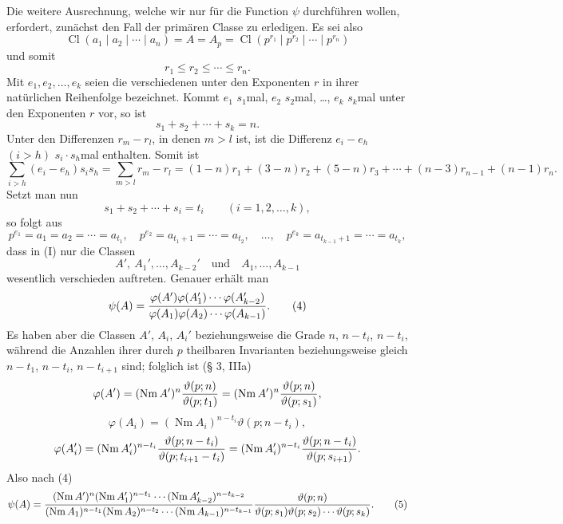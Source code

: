 \documentclass[11pt,a4paper]{article}
\newcommand{\Cl}{\operatorname{Cl}}
\newcommand{\Nm}{\operatorname{Nm}}
\newcommand{\tht}{\vartheta}
\begin{document}
Die weitere Ausrechnung, welche wir nur für die Function $\psi$ durchführen wollen, erfordert, zunächst den Fall der primären Classe zu erledigen. Es sei also
\[
 \Cl(a_1\mid a_2\mid\cdots\mid a_n)=A=A_p=
 \Cl(p^{r_1}\mid p^{r_2}\mid\cdots\mid p^{r_n})
\]
und somit
\[
 r_1\le r_2\le\cdots\le r_n.
\]
Mit $e_1,e_2,\ldots,e_k$ seien die verschiedenen unter den Exponenten $r$ in ihrer natürlichen Reihenfolge bezeichnet. Kommt $e_1$ $s_1$mal, $e_2$ $s_2$mal, \ldots, $e_k$ $s_k$mal unter den Exponenten $r$ vor, so ist
\begin{equation}
 s_1+s_2+\cdots+s_k=n.
\tag{1}
\end{equation}
Unter den Differenzen $r_m-r_l$, in denen $m>l$ ist, ist die Differenz $e_i-e_h$ $(i>h)$ $s_i\cdot s_h$mal enthalten. Somit ist
\begin{equation}
 \sum_{i>h}(e_i-e_h)s_i s_h=\sum_{m>l}r_m-r_l
 =(1-n)r_1+(3-n)r_2+(5-n)r_3+\cdots+(n-3)r_{n-1}+(n-1)r_n.
\tag{2}
\end{equation}
Setzt man nun
\[
 s_1+s_2+\cdots+s_i=t_i\qquad (i=1,2,\ldots,k),
\]
so folgt aus
\begin{equation}
 p^{e_1}=a_1=a_2=\cdots=a_{t_1},\quad
 p^{e_2}=a_{t_1+1}=\cdots=a_{t_2},\quad\ldots,\quad
 p^{e_k}=a_{t_{k-1}+1}=\cdots=a_{t_k},
\tag{3}
\end{equation}
dass in (I) nur die Classen
\[
 A',\ A_1',\ldots,A_{k-2}'
\quad\text{und}\quad
 A_1,\ldots,A_{k-1}
\]
wesentlich verschieden auftreten. Genauer erhält man
\begin{equation}
 \psi(A)=
 {\varphi(A')\varphi(A_1')\cdots\varphi(A_{k-2}')
 \over
 \varphi(A_1)\varphi(A_2)\cdots\varphi(A_{k-1})}.
\tag{4}
\end{equation}
Es haben aber die Classen $A'$, $A_i$, $A_i'$ beziehungsweise die Grade $n$, $n-t_i$, $n-t_i$, während die Anzahlen ihrer durch $p$ theilbaren Invarianten beziehungsweise gleich $n-t_1$, $n-t_i$, $n-t_{i+1}$ sind; folglich ist (§ 3, IIIa)
\[
 \varphi(A')=(\Nm A')^n {\tht(p;n)\over\tht(p;t_1)}=(\Nm A')^n {\tht(p;n)\over\tht(p;s_1)},
\]
\[
 \varphi(A_i)=(\Nm A_i)^{n-t_i}\tht(p;n-t_i),
\]
\[
 \varphi(A_i')=(\Nm A_i')^{n-t_i}
 {\tht(p;n-t_i)\over\tht(p;t_{i+1}-t_i)}
 = (\Nm A_i')^{n-t_i}{\tht(p;n-t_i)\over\tht(p;s_{i+1})}.
\]
Also nach (4)
\begin{equation}
 \psi(A)=
 { (\Nm A')^n(\Nm A_1')^{n-t_1}\cdots(\Nm A_{k-2}')^{n-t_{k-2}}
 \over
 (\Nm A_1)^{n-t_1}(\Nm A_2)^{n-t_2}\cdots(\Nm A_{k-1})^{n-t_{k-1}} }
 {\tht(p;n)\over\tht(p;s_1)\tht(p;s_2)\cdots\tht(p;s_k)}.
\tag{5}
\end{equation}
\end{document}
